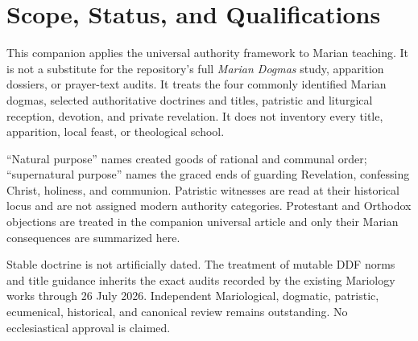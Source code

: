 \section{Scope, Status, and Qualifications}

This companion applies the universal authority framework to Marian teaching.
It is not a substitute for the repository's full \emph{Marian Dogmas} study,
apparition dossiers, or prayer-text audits. It treats the four commonly
identified Marian dogmas, selected authoritative doctrines and titles,
patristic and liturgical reception, devotion, and private revelation. It does
not inventory every title, apparition, local feast, or theological school.

``Natural purpose'' names created goods of rational and communal order;
``supernatural purpose'' names the graced ends of guarding Revelation,
confessing Christ, holiness, and communion. Patristic witnesses are read at
their historical locus and are not assigned modern authority categories.
Protestant and Orthodox objections are treated in the companion universal
article and only their Marian consequences are summarized here.

Stable doctrine is not artificially dated. The treatment of mutable DDF norms
and title guidance inherits the exact audits recorded by the existing
Mariology works through 26 July 2026. Independent Mariological,
dogmatic, patristic, ecumenical, historical, and canonical review remains
outstanding. No ecclesiastical approval is claimed.

